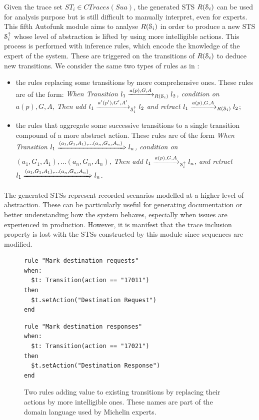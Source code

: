 Given the trace set $ST_i \in CTraces(Sua)$, the generated STS
$R(\EuScript{S}_i)$ can be used for analysis purpose but is still
difficult to manually interpret, even for experts.  This fifth
Autofunk module aims to analyse $R(\EuScript{S}_i)$ in order to
produce a new STS $\EuScript{S}_i^\uparrow$ whose level of
abstraction is lifted by using more intelligible actions. This
process is performed with inference rules, which encode the
knowledge of the expert of the system. These are triggered on the
transitions of $R(\EuScript{S}_i)$ to deduce new transitions. We
consider the same two types of rules as in
:

\begin{itemize}
    \item the rules replacing some transitions by more
    comprehensive ones. These rules are of the form: \textit{When
    Transition $l_1 \xrightarrow{a(p),G,A}_{R(\EuScript{S}_i)}
    l_2$, condition on $a(p),G,A$, Then add $l_1
    \xrightarrow{a'(p'),G',A'}_{\EuScript{S}_i^\uparrow} l_2$ and
    retract $l_1 \xrightarrow{a(p),G,A}_{R(\EuScript{S}_i)}
l_2$};

    \item the rules that aggregate some successive transitions
    to a single transition compound of a more abstract action.
    These rules are of the form \textit{When Transition $l_1
    \xRightarrow{(a_1,G_1,A_1),...(a_n,G_n,A_n)} l_n$, condition
    on $(a_1,G_1,A_1),...(a_n,G_n,A_n)$, Then add $l_1
    \xrightarrow{a(p),G,A}_{\EuScript{S}_i^\uparrow} l_n $, and
    retract $l_1 \xRightarrow{(a_1,G_1,A_1),...(a_n,G_n,A_n)} l_n$}.
\end{itemize}

The generated STSs represent recorded scenarios modelled at a
higher level of abstraction. These can be particularly useful for
generating documentation or better understanding how the system
behaves, especially when issues are experienced in production.
However, it is manifest that the trace inclusion property is lost
with the STSs constructed by this module since sequences are
modified.

\begin{figure}[ht]
\begin{framed}
\begin{BVerbatim}
rule "Mark destination requests"
when:
  $t: Transition(action == "17011")
then
  $t.setAction("Destination Request")
end
\end{BVerbatim}
\end{framed}

\begin{framed}
\begin{BVerbatim}
rule "Mark destination responses"
when:
  $t: Transition(action == "17021")
then
  $t.setAction("Destination Response")
end
\end{BVerbatim}
\end{framed}

  \caption{Two rules adding value to existing transitions by
  replacing their actions by more intelligible ones. These names
  are part of the domain language used by Michelin experts.}
  \label{rule:rename-tr}
\end{figure}

